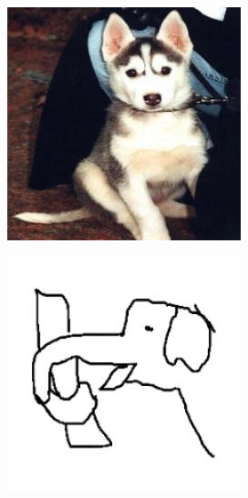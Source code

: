 \documentclass{article}
\begin{document}
\begin{center}
\begin{minipage}{0.142\textwidth}
    \end{minipage}%
    \begin{minipage}{0.142\textwidth}
        \includegraphics[width=\linewidth]{./pic/misclassified_r0_p6_2723.jpg}
    \end{minipage}%
    \begin{minipage}{0.142\textwidth}
        \includegraphics[width=\linewidth]{./pic/misclassified_r1_p0_2723.jpg}

\end{minipage}
\end{center}
\end{document}
